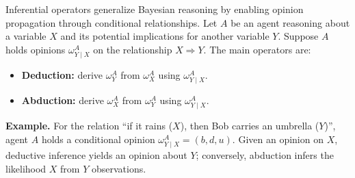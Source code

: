 \begin{definition}
\label{def:inferential_ops}
Inferential operators generalize Bayesian reasoning by enabling opinion propagation through conditional relationships. 
Let \( A \) be an agent reasoning about a variable \( X \) and its potential implications for another variable \( Y \). Suppose \( A \) holds opinions \(\omega^A_{Y\mid X}\) on the relationship \(X \Rightarrow Y\).
The main operators are:
\begin{itemize}
    \item \textbf{Deduction:} derive $\omega^A_Y$ from $\omega^A_X$ using $\omega^A_{Y\mid X}$.
    \item \textbf{Abduction:} derive $\omega^A_X$ from $\omega^A_Y$ using $\omega^A_{Y\mid X}$.
\end{itemize}

\textbf{Example.} For the relation “if it rains ($X$), then Bob carries an umbrella ($Y$)”, agent $A$ holds a conditional opinion $\omega^A_{Y\mid X} = (b,d,u)$. Given an opinion on \(X\), deductive inference yields an opinion about \(Y\); conversely, abduction infers the likelihood \(X\) from \(Y\) observations.
\end{definition}



